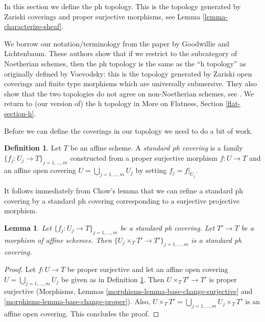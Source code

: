 \documentclass{stacks-project}
\theoremstyle{plain}
\newtheorem{lemma}[subsection]{Lemma}
\theoremstyle{definition}
\newtheorem{definition}[subsection]{Definition}
\theoremstyle{remark}
\numberwithin{equation}{subsection}
\begin{document}
\noindent
In this section we define the ph topology. This is the topology
generated by Zariski coverings and proper surjective morphisms, see
Lemma \ref{lemma-characterize-sheaf}.

\medskip\noindent
We borrow our notation/terminology
from the paper \cite{ph} by Goodwillie and Lichtenbaum.
These authors show that if we restrict to the subcategory of
Noetherian schemes, then the ph topology is the same as the
``h topology'' as originally defined by Voevodsky: this is
the topology generated by Zariski open coverings and
finite type morphisms which are universally submersive.
They also show that the two topologies do not agree on
non-Noetherian schemes, see \cite[Example 4.5]{ph}.
We return to (our version of) the h topology in
More on Flatness, Section \ref{flat-section-h}.

\medskip\noindent
Before we can define the coverings in our topology we need to do
a bit of work.

\begin{definition}
\label{definition-standard-ph-covering}
Let $T$ be an affine scheme. A {\it standard ph covering} is a family
$\{f_j : U_j \to T\}_{j = 1, \ldots, m}$ constructed from a
proper surjective morphism $f : U \to T$ and an affine open covering
$U = \bigcup_{j = 1, \ldots, m} U_j$ by setting $f_j = f|_{U_j}$.
\end{definition}

\noindent
It follows immediately from Chow's lemma that we can refine a
standard ph covering by a standard ph covering corresponding to
a surjective projective morphism.

\begin{lemma}
\label{lemma-base-change-standard-ph}
Let $\{f_j : U_j \to T\}_{j = 1, \ldots, m}$ be a standard ph covering.
Let $T' \to T$ be a morphism of affine schemes.
Then $\{U_j \times_T T' \to T'\}_{j = 1, \ldots, m}$ is a
standard ph covering.
\end{lemma}

\begin{proof}
Let $f : U \to T$ be proper surjective and let an affine open covering
$U = \bigcup_{j = 1, \ldots, m} U_j$ be given as in
Definition \ref{definition-standard-ph-covering}.
Then $U \times_T T' \to T'$ is proper surjective
(Morphisms, Lemmas \ref{morphisms-lemma-base-change-surjective} and
\ref{morphisms-lemma-base-change-proper}).
Also, $U \times_T T' = \bigcup_{j = 1, \ldots, m} U_j \times_T T'$
is an affine open covering.
This concludes the proof.
\end{proof}
\end{document}
